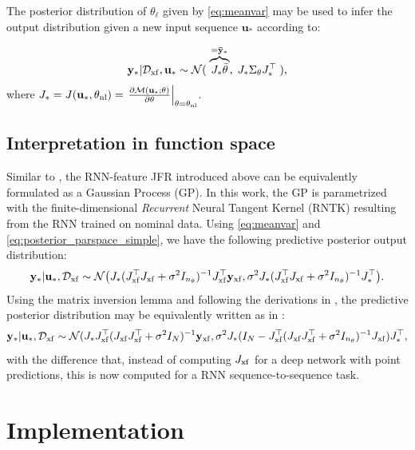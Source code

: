 \documentclass{article}
\newcommand{\nsamp}{{N}}
\newcommand{\npar}{{n_\theta}}
\newcommand{\M}{\mathcal{M}}
\newcommand{\N}{\mathcal{N}} %
\newcommand{\D}{\mathcal{D}}
\newcommand{\transf}{{\rm{xf}}}
\newcommand{\lin}{{\ell}}
\newcommand{\nominal}{{\rm{nl}}}
\newcommand{\tvec}[1]{{\mathbf{#1}}}
\begin{document}
The posterior distribution of $\theta_\lin$ given by \eqref{eq:meanvar} may be used to infer the output distribution given a new input sequence $\tvec{u}_*$ according to:

\begin{equation}
    \label{eq:posterior_parspace_simple}
   \tvec{y}_* | \D_\transf, \tvec{u}_* \sim \N(\;\overbrace{J_* \bar{\theta}}^{=\tvec{\bar{y}}_*},\; J_* \Sigma_{\theta} J_*^\top\;),
\end{equation}
where $J_* = J(\tvec{u}_*, \theta_\nominal) = \left . \frac{\partial \M(\tvec{u_*}; \theta)}{\partial \theta} \right |_{\theta = \theta_\nominal}$.

\subsection{Interpretation in function space}
\label{sec:funspace_interp}
Similar to \cite{maddox2021fast}, the RNN-feature JFR introduced above can be equivalently formulated as a Gaussian Process (GP). In this work, the GP is parametrized with the finite-dimensional \emph{Recurrent} Neural Tangent Kernel (RNTK) resulting from the RNN trained on nominal data. Using \eqref{eq:meanvar} and \eqref{eq:posterior_parspace_simple}, we have the following predictive posterior output distribution:
\begin{equation}
\label{eq:posterior_parspace_full}
 \tvec{y}_* | \tvec{u}_*, \D_\transf \sim \N\big(J_* (J^\top_\transf J_\transf + \sigma^2 I_\npar)^{-1}J^\top_\transf \tvec{y}_\transf, 
 \sigma^2 J_* (J_\transf^\top J_\transf + \sigma^2 I_\npar)^{-1} J_*^\top\big).
\end{equation}
Using the matrix inversion lemma and following the derivations in  \cite[Chapter~1]{rasmussen2006gaussian}, the predictive posterior distribution may be equivalently written as in \cite[Equation 3]{maddox2021fast}:
\begin{equation}
\label{eq:posterior_funspace}
 \tvec{y}_* | \tvec{u}_*, \D_\transf \sim \N(
 J_* J_\transf^\top(J_\transf J_\transf^\top + \sigma^2 I_\nsamp)^{-1}\tvec{y}_\transf, 
 \sigma^2 J_*(I_\nsamp - J_\transf^\top(J_\transf J_\transf^\top + \sigma^2 I_{\npar})^{-1} 
 J_\transf)J_*^\top,
\end{equation}
with the difference that, instead of computing $J_\transf$ for a deep network with point predictions, this is now computed for a RNN sequence-to-sequence task. 



\section{Implementation}
\label{sec:implementation}
\end{document}
